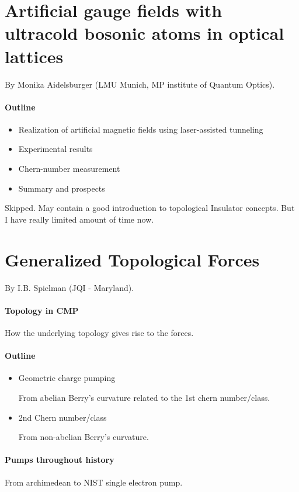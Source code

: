\documentclass{article}
\numberwithin{equation}{subsection} %
\theoremstyle{definition}
\begin{document}
\section{Artificial gauge fields with ultracold bosonic atoms in optical
lattices}
\label{sec:Artificial-gauge-fields-with-ultracold-bosonic-atoms-in-optical
lattices}
By Monika Aidelsburger (LMU Munich, MP institute of Quantum Optics).

\paragraph{Outline}
\begin{itemize}
    \item Realization of artificial magnetic fields using laser-assisted
        tunneling
    \item Experimental results
    \item Chern-number measurement
    \item Summary and prospects
\end{itemize}
Skipped. May contain a good introduction to topological Insulator
concepts. But I have really limited amount of time now.

\section{Generalized Topological Forces}
\label{sec:Generalized-Topological-Forces}
By I.B. Spielman (JQI - Maryland).

\paragraph{Topology in CMP}
How the underlying topology gives rise to the forces.
\paragraph{Outline}
\begin{itemize}
    \item Geometric charge pumping

        From abelian Berry's curvature related to the 1st chern
        number/class.
    \item 2nd Chern number/class

        From non-abelian Berry's curvature.
\end{itemize}
\paragraph{Pumps throughout history} From archimedean to NIST single
electron pump. 
\end{document}
